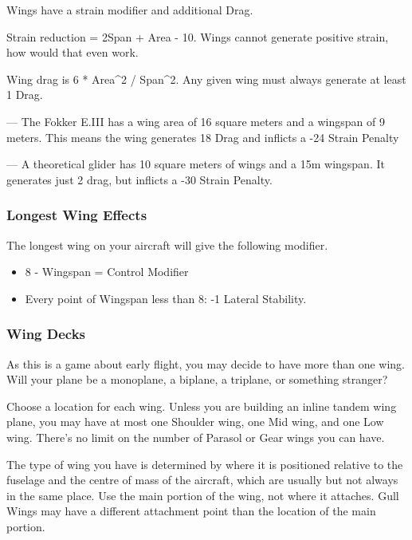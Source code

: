 \documentclass{article}
\begin{document}
Wings have a strain modifier and additional Drag.

Strain reduction = 2Span + Area - 10. Wings cannot generate positive
strain, how would that even work.

Wing drag is 6 * Area\^{}2 / Span\^{}2. Any given wing must always
generate at least 1 Drag.

--- The Fokker E.III has a wing area of 16 square
meters and a wingspan of 9 meters. This means the wing generates
18 Drag and inflicts a -24 Strain Penalty

--- A theoretical glider has 10 square meters of wings and a
15m wingspan. It generates just 2 drag,
but inflicts a -30 Strain Penalty.

\subsubsection{Longest Wing Effects}
\label{_Longest Wing Effects}

The longest wing on your aircraft will give the following modifier.

\begin{itemize}
    \item          8 - Wingspan = Control Modifier
    \item          Every point of Wingspan less than 8: -1 Lateral Stability.
\end{itemize}

\subsubsection{Wing Decks}
\label{_Wing Decks}

As this is a game about early flight, you may decide to have more than
one wing. Will your plane be a monoplane, a biplane, a triplane, or
something stranger?

Choose a location for each wing. Unless you are building an inline
tandem wing plane, you may have at most one Shoulder wing, one Mid wing,
and one Low wing. There's no limit on the number of Parasol or Gear
wings you can have.

The type of wing you have is determined by where it is positioned
relative to the fuselage and the centre of mass of the aircraft, which
are usually but not always in the same place.  Use the main portion of
the wing, not where it attaches.  Gull Wings may have a different attachment
point than the location of the main portion.
\end{document}
